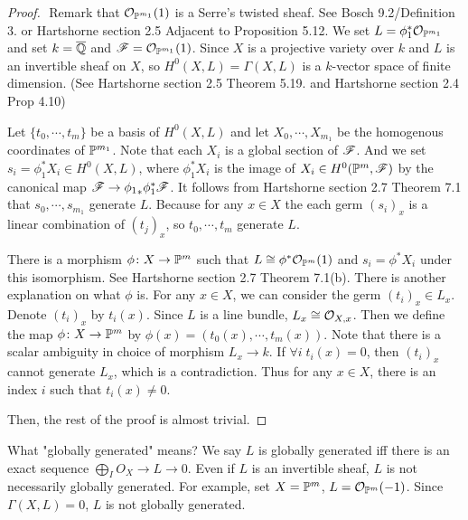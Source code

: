\begin{proof} ${}$
  Remark that $\calo_{\P^{m_1}}(1)$ is a Serre's twisted sheaf. See Bosch\cite{Bosch} 9.2/Definition 3. or Hartshorne\cite{ha} section 2.5 Adjacent to Proposition 5.12.
We set $L = \phi_1^* \calo_{\P^{m_1}}$ and set $k = \ol{\Q}$ and $\scrf = \calo_{\P^{m_1}}(1)$. Since $X$ is a projective variety over $k$ and $L$ is an invertible sheaf on $X$, so $H^0(X,L) = \Gamma(X,L)$ is a $k$-vector space of finite dimension. (See Hartshorne\cite{ha} section 2.5 Theorem 5.19. and Hartshorne\cite{ha} section 2.4 Prop 4.10)

Let $\{ t_0, \cdots , t_m \}$ be a basis of $H^0(X,L)$ and let $X_0, \cdots , X_{m_1}$ be the homogenous coordinates of $\P^{m_1}$. Note that each $X_i$ is a global section of $\scrf$. And we set $s_i = \phi_1^* X_i \in H^0(X,L)$, where $\phi_1^* X_i$ is the image of $X_i \in H^0(\P^m, \scrf)$ by the canonical map $\scrf \to {\phi_1}_* \phi_1^* \scrf$.
It follows from Hartshorne\cite{ha} section 2.7 Theorem 7.1 that $s_0, \cdots , s_{m_1}$ generate $L$. Because for any $x \in X$ the each germ $(s_i)_x$ is a linear combination of $(t_j)_x$, so $t_0, \cdots ,t_m$ generate $L$.

There is a morphism $\phi \colon X \to \P^m $ such that $L \cong \phi^* \calo_{\P^m}(1)$ and $s_i = \phi^* X_i$ under this isomorphism. See Hartshorne\cite{ha} section 2.7 Theorem 7.1(b). There is another explanation on what $\phi$ is. For any $x \in X$, we can consider the germ $(t_i)_x \in L_x$. Denote $(t_i)_x$ by $t_i(x)$. Since $L$ is a line bundle, $L_x \cong \calo_{X,x}$.
Then we define the map $\phi \colon X \to \P^m$ by $\phi(x) = (t_0(x), \cdots , t_m(x))$. Note that there is a scalar ambiguity in choice of morphism $L_x \to k$. If $\forall i \; t_i(x) = 0$, then $(t_i)_x$ cannot generate $L_x$, which is a contradiction. Thus for any $x \in X$,
there is an index $i$ such that $t_i(x) \neq 0$.

Then, the rest of the proof is almost trivial.
\end{proof}


\begin{rem}
  What "globally generated" means? We say $L$ is globally generated iff there is an exact sequence $\bigoplus_I O_X \to L \to 0$. Even if $L$ is an invertible sheaf, $L$ is not necessarily globally generated. For example, set $X = \P^m$, $L = \calo_{\P^m}(-1)$. Since $\Gamma(X,L) = 0$, $L$ is not globally generated.
\end{rem}


